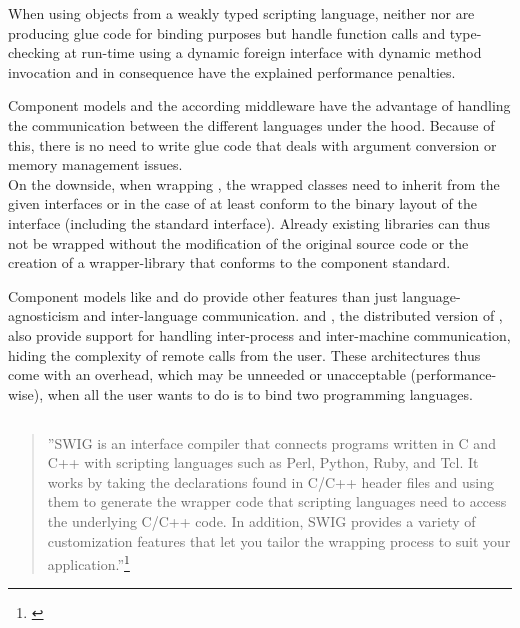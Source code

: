 When using objects from a weakly typed scripting language, neither  nor  are producing glue code for binding purposes but handle function calls and type-checking at run-time using a dynamic foreign interface with dynamic method invocation and in consequence have the explained performance penalties.

Component models and the according middleware have the advantage of handling the communication between the different languages under the hood. Because of this, there is no need to write glue code that deals with argument conversion or memory management issues.\\
On the downside, when wrapping , the wrapped classes need to inherit from the given interfaces or in the case of  at least conform to the binary layout of the interface (including the standard  interface). Already existing libraries can thus not be wrapped without the modification of the original source code or the creation of a wrapper-library that conforms to the component standard.


Component models like  and  do provide other features than just language-agnosticism and inter-language communication.  and , the distributed version of , also provide support for handling inter-process and inter-machine communication, hiding the complexity of remote calls from the user. These architectures thus come with an overhead, which may be unneeded or unacceptable (performance-wise), when all the user wants to do is to bind two programming languages.


\newpage
\subsection{}

\begin{quotation}
''SWIG is an interface compiler that connects programs written in C and C++ with scripting languages such as Perl, Python, Ruby, and Tcl. It works by taking the declarations found in C/C++ header files and using them to generate the wrapper code that scripting languages need to access the underlying C/C++ code. In addition, SWIG provides a variety of customization features that let you tailor the wrapping process to suit your application.''\footnote{\citep{SWIGHPExec}}
\end{quotation}

